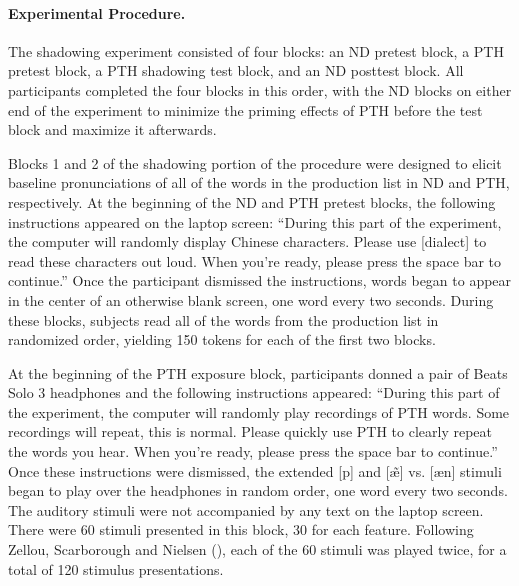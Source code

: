 \paragraph{Experimental Procedure.}
\label{para:shadowingProcedure}
The shadowing experiment consisted of four blocks: an ND pretest block, a PTH pretest block, a PTH shadowing test block, and an ND posttest block. All participants completed the four blocks in this order, with the ND blocks on either end of the experiment to minimize the priming effects of PTH before the test block and maximize it afterwards.

Blocks 1 and 2 of the shadowing portion of the procedure were designed to elicit baseline pronunciations of all of the words in the production list in ND and PTH, respectively. At the beginning of the ND and PTH pretest blocks, the following instructions appeared on the laptop screen: ``During this part of the experiment, the computer will randomly display Chinese characters. Please use [dialect] to read these characters out loud. When you're ready, please press the space bar to continue.'' Once the participant dismissed the instructions, words began to appear in the center of an otherwise blank screen, one word every two seconds. During these blocks, subjects read all of the words from the production list in randomized order, yielding 150 tokens for each of the first two blocks.  

At the beginning of the PTH exposure block, participants donned a pair of Beats Solo 3 headphones and the following instructions appeared: ``During this part of the experiment, the computer will randomly play recordings of PTH words. Some recordings will repeat, this is normal. Please quickly use PTH to clearly repeat the words you hear. When you're ready, please press the space bar to continue.'' Once these instructions were dismissed, the extended [p] and [\~{\ae}] vs. [\ae n] stimuli began to play over the headphones in random order, one word every two seconds. The auditory stimuli were not accompanied by any text on the laptop screen. There were 60 stimuli presented in this block, 30 for each feature. Following Zellou, Scarborough and Nielsen (\cite{zellou2016phonetic}), each of the 60 stimuli was played twice, for a total of 120 stimulus presentations. 



